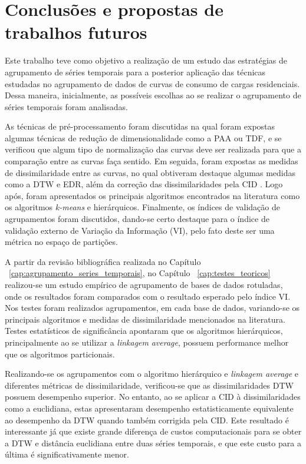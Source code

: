 \chapter{Conclusões e propostas de trabalhos futuros} \label{cap:conclusao}

Este trabalho teve como objetivo a realização de um estudo das estratégias de agrupamento de séries temporais para a posterior aplicação das técnicas estudadas no agrupamento de dados de curvas de consumo de cargas residenciais. Dessa maneira, inicialmente, as possíveis escolhas ao se realizar o agrupamento de séries temporais foram analisadas.

As técnicas de pré-processamento foram discutidas na qual foram expostas algumas técnicas de redução de dimensionalidade como a PAA ou TDF, e se verificou que algum tipo de normalização das curvas deve ser realizada para que a comparação entre as curvas faça sentido. Em seguida, foram expostas as medidas de dissimilaridade entre as curvas, no qual obtiveram destaque algumas medidas como a DTW e EDR, além da correção das dissimilaridades pela CID \parencite{CID}. Logo após, foram apresentados os principais algoritmos encontrados na literatura como os algoritmos \emph{k-means} e hierárquicos. Finalmente, os índices de validação de agrupamentos foram discutidos, dando-se certo destaque para o índice de validação externo de Variação da Informação (VI), pelo fato deste ser uma métrica no espaço de partições.

A partir da revisão bibliográfica realizada no Capítulo ~\ref{cap:agrupamento_series_temporais}, no Capítulo ~\ref{cap:testes_teoricos} realizou-se um estudo empírico de agrupamento de bases de dados rotuladas, onde os resultados foram comparados com o resultado esperado pelo índice VI. Nos testes foram realizados agrupamentos, em cada base de dados, variando-se os principais algoritmos e medidas de dissimilaridade mencionados na literatura. Testes estatísticos de significância apontaram que os algoritmos hierárquicos, principalmente ao se utilizar a \emph{linkagem} \emph{average}, possuem performance melhor que os algoritmos particionais. 

Realizando-se os agrupamentos com o algoritmo hierárquico e \emph{linkagem average} e diferentes métricas de dissimilaridade, verificou-se que as dissimilaridades DTW \parencite{DTW} possuem desempenho superior. No entanto, ao se aplicar a CID à dissimilaridades como a euclidiana, estas apresentaram desempenho estatisticamente equivalente ao desempenho da DTW quando também corrigida pela CID. Este resultado é interessante já que existe grande diferença de custos computacionais para se obter a DTW e distância euclidiana entre duas séries temporais, e que este custo para a última é significativamente menor.

